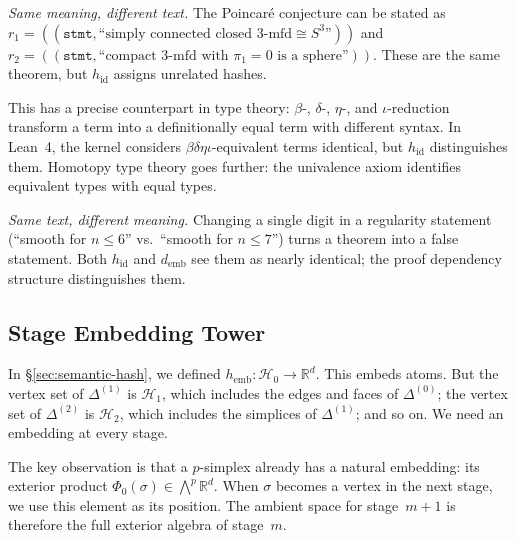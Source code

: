 \begin{example}\label{ex:poincare-pitts}
\emph{Same meaning, different text.} The Poincar\'{e} conjecture can be stated as $r_1 = ((\texttt{stmt}, \text{``simply connected closed 3-mfd} \cong S^3\text{''}))$ and $r_2 = ((\texttt{stmt}, \text{``compact 3-mfd with } \pi_1 = 0 \text{ is a sphere''}))$. These are the same theorem, but $h_{\mathrm{id}}$ assigns unrelated hashes.

This has a precise counterpart in type theory: $\beta$-, $\delta$-, $\eta$-, and $\iota$-reduction transform a term into a definitionally equal term with different syntax. In Lean~4, the kernel considers $\beta\delta\eta\iota$-equivalent terms identical, but $h_{\mathrm{id}}$ distinguishes them. Homotopy type theory goes further: the univalence axiom identifies equivalent types with equal types.

\emph{Same text, different meaning.} Changing a single digit in a regularity statement (``smooth for $n \leq 6$'' vs.\ ``smooth for $n \leq 7$'') turns a theorem into a false statement. Both $h_{\mathrm{id}}$ and $d_{\mathrm{emb}}$ see them as nearly identical; the proof dependency structure distinguishes them.
\end{example}


\subsection{Stage Embedding Tower}\label{sec:stage-tower}

In \S\ref{sec:semantic-hash}, we defined $h_{\mathrm{emb}}: \mathcal{H}_0 \to \mathbb{R}^d$. This embeds atoms. But the vertex set of $\Delta^{(1)}$ is $\mathcal{H}_1$, which includes the edges and faces of $\Delta^{(0)}$; the vertex set of $\Delta^{(2)}$ is $\mathcal{H}_2$, which includes the simplices of $\Delta^{(1)}$; and so on. We need an embedding at every stage.

The key observation is that a $p$-simplex already has a natural embedding: its exterior product $\Phi_0(\sigma) \in \bigwedge^p \mathbb{R}^d$. When $\sigma$ becomes a vertex in the next stage, we use this element as its position. The ambient space for stage~$m+1$ is therefore the full exterior algebra of stage~$m$.

